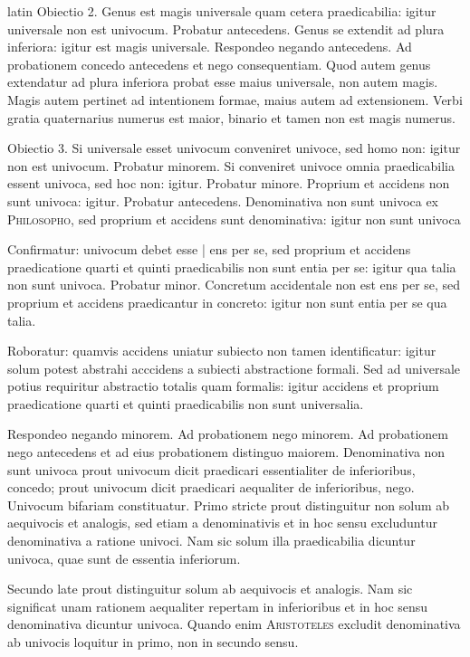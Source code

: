 \begin{otherlanguage*}{latin}
\pstart
  Obiectio 2. Genus est magis universale quam cetera praedicabilia: igitur universale non est univocum. Probatur antecedens. Genus se extendit ad plura inferiora: igitur est magis universale. Respondeo negando antecedens. Ad probationem concedo antecedens et nego consequentiam. Quod autem genus extendatur ad plura inferiora probat esse maius universale, non autem magis. Magis autem pertinet ad intentionem formae, maius autem ad extensionem. Verbi gratia quaternarius numerus est maior, binario et tamen non est magis numerus. 
\pend

\pstart
  Obiectio 3. Si universale esset univocum conveniret univoce, sed homo non: igitur non est univocum. Probatur minorem. Si conveniret univoce omnia praedicabilia essent univoca, sed hoc non: igitur. Probatur minore. Proprium et accidens non sunt univoca: igitur. Probatur antecedens. Denominativa non sunt univoca ex \textsc{Philosopho}, sed proprium et accidens sunt denominativa: igitur non sunt univoca 
\pend

\pstart
  Confirmatur: univocum debet esse \textnormal{|} ens per se, sed proprium et accidens praedicatione quarti et quinti praedicabilis non sunt entia per se: igitur qua talia non sunt univoca. Probatur minor. Concretum accidentale non est ens per se, sed proprium et accidens praedicantur in concreto: igitur non sunt entia per se qua talia. 
\pend

\pstart
  Roboratur: quamvis accidens uniatur subiecto non tamen identificatur: igitur solum potest abstrahi acccidens a subiecti abstractione formali. Sed ad universale potius requiritur abstractio totalis quam formalis: igitur accidens et proprium praedicatione quarti et quinti praedicabilis non sunt universalia. 
\pend

\pstart
  Respondeo negando minorem. Ad probationem nego minorem. Ad probationem nego antecedens et ad eius probationem distinguo maiorem. Denominativa non sunt univoca prout univocum dicit praedicari essentialiter de inferioribus, concedo; prout univocum dicit praedicari aequaliter de inferioribus, nego. Univocum bifariam constituatur. Primo stricte prout distinguitur non solum ab aequivocis et analogis, sed etiam a denominativis et in hoc sensu excluduntur denominativa a ratione univoci. Nam sic solum illa praedicabilia dicuntur univoca, quae sunt de essentia inferiorum. 
\pend

\pstart
  Secundo late prout distinguitur solum ab aequivocis et analogis. Nam sic significat unam rationem aequaliter repertam in inferioribus et in hoc sensu denominativa dicuntur univoca. Quando enim \textsc{Aristoteles} excludit denominativa ab univocis loquitur in primo, non in secundo sensu. 
\pend


\end{otherlanguage*}
